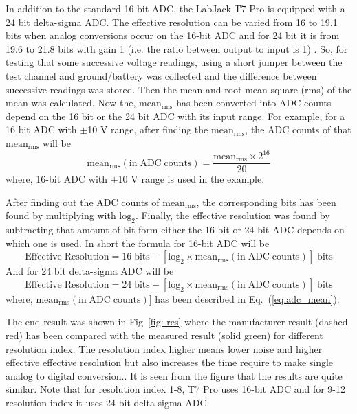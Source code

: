 In addition to the standard 16-bit ADC, the LabJack T7-Pro is equipped with a 24 bit delta-sigma ADC. The effective resolution can be varied from 16 to 19.1 bits when analog conversions occur on the 16-bit ADC and for 24 bit it is from 19.6 to 21.8 bits with gain 1 (i.e. the ratio between output to input is 1) \cite{T7}. So, for testing that some successive voltage readings, using a short jumper between the test channel and ground/battery was collected and the difference between successive readings was stored. Then the mean and root mean square (rms) of the mean was calculated. Now the, $\mathrm{mean_{rms}}$ has been converted into ADC counts depend on the 16 bit or the 24 bit ADC with its input range. For example, for a 16 bit ADC with $\pm$10 V range, after finding the $\mathrm{mean_{rms}}$, the ADC counts of that $\mathrm{mean_{rms}}$ will be
\begin{equation}\label{eq:adc_mean}
    \mathrm{mean_{rms} (in\;ADC \;counts)=\frac{mean_{rms}\times 2^{16}}{20}}
\end{equation}
where, 16-bit ADC with $\pm$10 V range is used in the example.

After finding out the ADC counts of $\mathrm{mean_{rms}}$, the corresponding bits has been found by multiplying with $\mathrm{log_2}$.  Finally, the effective resolution was found by subtracting that amount of bit form either the 16 bit or 24 bit ADC depends on which one is used. In short the formula \cite{T7} for 16-bit ADC will be
\begin{equation}
    \mathrm{Effective\;Resolution=16\;bits - [log_2 \times mean_{rms} (in\;ADC \;counts)]\;bits}
\end{equation}
And for 24 bit delta-sigma ADC will be
\begin{equation}
    \mathrm{Effective\;Resolution=24\;bits - [log_2 \times mean_{rms} (in\;ADC \;counts)]\;bits}
\end{equation}
where, $\mathrm{mean_{rms} (in\;ADC \;counts)]}$ has been described in Eq.~(\ref{eq:adc_mean}).


The end result was shown in Fig~\ref{fig: res} where the manufacturer \cite{T7} result (dashed red) has been compared with the measured result (solid green) for different resolution index. The resolution index higher means lower noise and higher effective effective resolution but also increases the time require to make single analog to digital conversion.. It is seen from the figure that the results are quite similar. Note that for resolution index 1-8, T7 Pro uses 16-bit ADC and for 9-12 resolution index it uses 24-bit delta-sigma ADC. 

